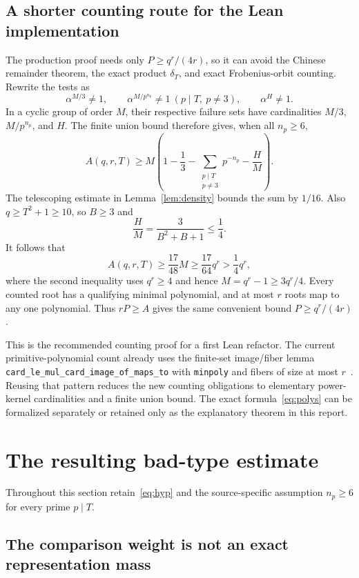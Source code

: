 \documentclass[11pt,a4paper]{article}
\newcommand{\src}[1]{\nolinkurl{#1}}
\theoremstyle{definition}
\theoremstyle{remark}
\begin{document}
\subsection{A shorter counting route for the Lean implementation}
\label{sec:union}

The production proof needs only $P\ge q^r/(4r)$, so it can avoid the
Chinese remainder theorem, the exact product $\delta_T$, and exact
Frobenius-orbit counting. Rewrite the tests as
\[
 \alpha^{M/3}\ne1,\qquad
 \alpha^{M/p^{n_p}}\ne1\ (p\mid T,\ p\ne3),\qquad \alpha^H\ne1.
\]
In a cyclic group of order $M$, their respective failure sets have
cardinalities $M/3$, $M/p^{n_p}$, and $H$. The finite union bound therefore
gives, when all $n_p\ge6$,
\[
 A(q,r,T)\ge M\left(1-\frac13-
       \sum_{\substack{p\mid T\\p\ne3}}p^{-n_p}-\frac HM\right).
\]
The telescoping estimate in Lemma~\ref{lem:density} bounds the sum by
$1/16$. Also $q\ge T^2+1\ge10$, so $B\ge3$ and
\[
 \frac HM=\frac3{B^2+B+1}\le\frac14.
\]
It follows that
\begin{equation}
 A(q,r,T)\ge\frac{17}{48}M
 \ge\frac{17}{64}q^r>\frac14q^r,
 \label{eq:union}
\end{equation}
where the second inequality uses $q^r\ge4$ and hence
$M=q^r-1\ge3q^r/4$. Every counted root has a qualifying minimal
polynomial, and at most $r$ roots map to any one polynomial. Thus
$rP\ge A$ gives the same convenient bound $P\ge q^r/(4r)$.

This is the recommended counting proof for a first Lean refactor.
The current primitive-polynomial count already uses the finite-set
image/fiber lemma \src{card_le_mul_card_image_of_maps_to} with
\src{minpoly} and fibers of size at most $r$~\cite{badtypes}.
Reusing that pattern reduces the new counting obligations to elementary
power-kernel cardinalities and a finite union bound. The exact
formula~\eqref{eq:polys} can be formalized separately or retained only
as the explanatory theorem in this report.

\section{The resulting bad-type estimate}
\label{sec:weight}

Throughout this section retain~\eqref{eq:hyp} and the source-specific
assumption $n_p\ge6$ for every prime $p\mid T$.

\subsection{The comparison weight is not an exact representation mass}
\end{document}
